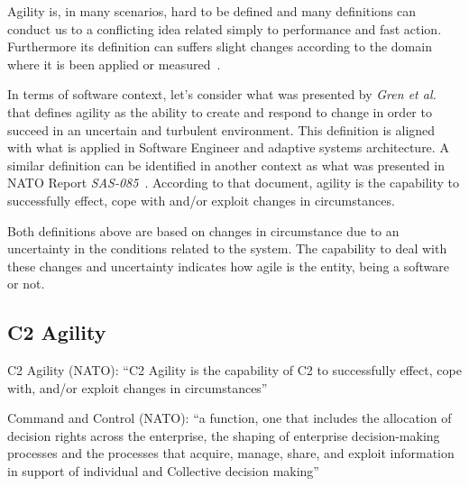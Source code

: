 Agility is, in many scenarios, hard to be defined and many definitions can conduct us to a conflicting idea related simply to performance and fast action. Furthermore its definition can suffers slight changes according to the domain where it is been applied or measured~\cite{Gren2019AgilityIR}\cite{Alberts2011}.

In terms of software context, let's consider what was presented by \textit{Gren et al.}~\cite{Gren2019AgilityIR} that defines agility as the ability to create and respond to change in order to succeed in an uncertain and turbulent environment. This definition is aligned with what is applied in Software Engineer and adaptive systems architecture. A similar definition can be identified in another context as what was presented in NATO Report \textit{SAS-085}~\cite{FRANCE2014}. According to that document, agility is the capability to successfully effect, cope with and/or exploit changes in circumstances. 

Both definitions above are based on changes in circumstance due to an uncertainty in the conditions related to the system. The capability to deal with these changes and uncertainty indicates how agile is the entity, being a software or not.



\subsection{C2 Agility}
C2 Agility (NATO): ``C2 Agility is the capability of C2 to successfully effect, cope with, and/or exploit changes in circumstances''

Command and Control (NATO): ``a function, one that includes the allocation of decision rights across the enterprise, the shaping of enterprise decision-making processes and the processes that acquire, manage, share, and exploit information in support of individual and Collective decision making''
